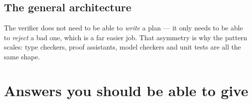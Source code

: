 \documentclass[11pt,a4paper]{article}
\begin{document}
\subsection{The general architecture}

\begin{center}
\end{center}

The verifier does not need to be able to \emph{write} a plan --- it only needs
to be able to \emph{reject} a bad one, which is a far easier job. That
asymmetry is why the pattern scales: type checkers, proof assistants,
model checkers and unit tests are all the same shape.

\section{Answers you should be able to give}
\end{document}
